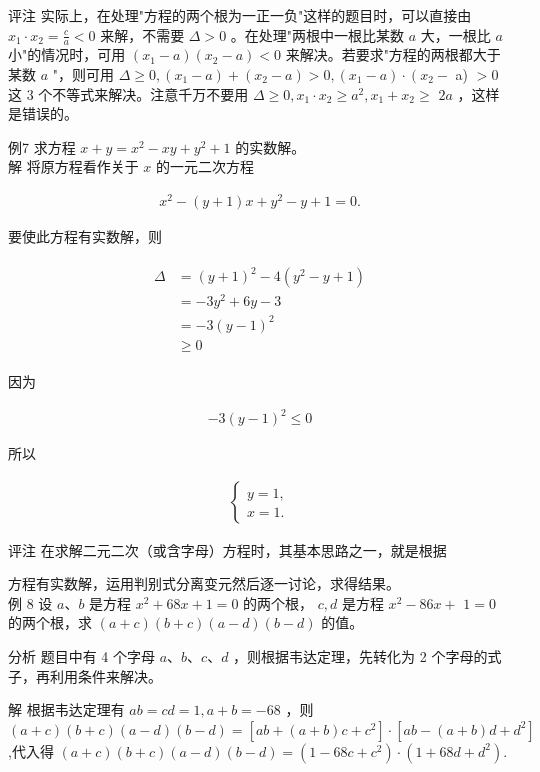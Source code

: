 \documentclass[10pt]{article}
\begin{document}
评注 实际上，在处理"方程的两个根为一正一负"这样的题目时，可以直接由 $x_{1} \cdot x_{2}=\frac{c}{a}<0$ 来解，不需要 $\Delta>0$ 。在处理"两根中一根比某数 $a$ 大，一根比 $a$ 小"的情况时，可用 $\left(x_{1}-a\right)\left(x_{2}-a\right)<0$ 来解决。若要求"方程的两根都大于某数 $a$ "，则可用 $\Delta \geqslant 0,\left(x_{1}-a\right)+\left(x_{2}-a\right)>0,\left(x_{1}-a\right) \cdot\left(x_{2}-\right.$ a) $>0$ 这 3 个不等式来解决。注意千万不要用 $\Delta \geqslant 0, x_{1} \cdot x_{2} \geqslant a^{2}, x_{1}+x_{2} \geqslant$ $2 a$ ，这样是错误的。

例7 求方程 $x+y=x^{2}-x y+y^{2}+1$ 的实数解。\\
解 将原方程看作关于 $x$ 的一元二次方程

\begin{align*}
x^{2}-(y+1) x+y^{2}-y+1=0 .
\end{align*}

要使此方程有实数解，则

\begin{align*}
\begin{aligned}
\Delta & =(y+1)^{2}-4\left(y^{2}-y+1\right) \\
& =-3 y^{2}+6 y-3 \\
& =-3(y-1)^{2} \\
& \geqslant 0
\end{aligned}
\end{align*}

因为

\begin{align*}
-3(y-1)^{2} \leqslant 0
\end{align*}

所以

\begin{align*}
\left\{\begin{array}{l}
y=1, \\
x=1 .
\end{array}\right.
\end{align*}

评注 在求解二元二次（或含字母）方程时，其基本思路之一，就是根据

方程有实数解，运用判别式分离变元然后逐一讨论，求得结果。\\
例 8 设 $a 、 b$ 是方程 $x^{2}+68 x+1=0$ 的两个根， $c, d$ 是方程 $x^{2}-86 x+$ $1=0$ 的两个根，求 $(a+c)(b+c)(a-d)(b-d)$ 的值。

分析 题目中有 4 个字母 $a 、 b 、 c 、 d$ ，则根据韦达定理，先转化为 2 个字母的式子，再利用条件来解决。

解 根据韦达定理有 $a b=c d=1, a+b=-68$ ，则\\
$(a+c)(b+c)(a-d)(b-d)=\left[a b+(a+b) c+c^{2}\right] \cdot\left[a b-(a+b) d+d^{2}\right]$,代入得 $(a+c)(b+c)(a-d)(b-d)=\left(1-68 c+c^{2}\right) \cdot\left(1+68 d+d^{2}\right)$.
\end{document}

